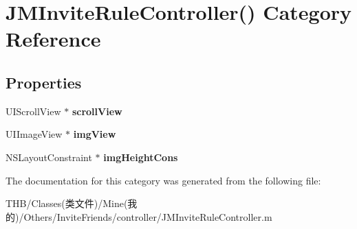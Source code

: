 \hypertarget{category_j_m_invite_rule_controller_07_08}{}\section{J\+M\+Invite\+Rule\+Controller() Category Reference}
\label{category_j_m_invite_rule_controller_07_08}
\subsection*{Properties}
\begin{DoxyCompactItemize}
\item 
\mbox{\label{category_j_m_invite_rule_controller_07_08_a81f724f6be8cd2d528eba63cfb059ccf}} 
U\+I\+Scroll\+View $\ast$ {\bfseries scroll\+View}
\item 
\mbox{\label{category_j_m_invite_rule_controller_07_08_acf0d5d18293083beb3720df8f32ca5bb}} 
U\+I\+Image\+View $\ast$ {\bfseries img\+View}
\item 
\mbox{\label{category_j_m_invite_rule_controller_07_08_a428519d3d2c9f47a8101dfb4cee46812}} 
N\+S\+Layout\+Constraint $\ast$ {\bfseries img\+Height\+Cons}
\end{DoxyCompactItemize}


The documentation for this category was generated from the following file\+:\begin{DoxyCompactItemize}
\item 
T\+H\+B/\+Classes(类文件)/\+Mine(我的)/\+Others/\+Invite\+Friends/controller/J\+M\+Invite\+Rule\+Controller.\+m\end{DoxyCompactItemize}
